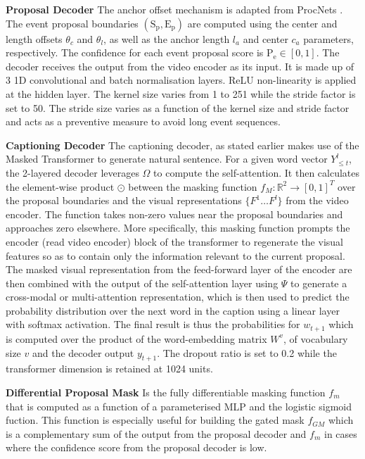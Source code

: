 \textbf{Proposal Decoder} The anchor offset mechanism is adapted from ProcNets \cite{Zhou2017TowardsAL}. The event proposal boundaries $(\mathrm{S_p}, \mathrm{E_p})$ are computed using the center and length offsets $\theta_c$ and $\theta_l$, as well as the anchor length $l_a$ and center $c_a$ parameters, respectively. The confidence for each event proposal score is $\mathrm{P_e} \in [0,1]$. The decoder receives the output from the video encoder as its input. It is made up of 3 1D convolutional and batch normalisation layers. ReLU non-linearity is applied at the hidden layer. The kernel size varies from 1 to 251 while the stride factor is set to 50. The stride size varies as a function of the kernel size and stride factor and acts as a preventive measure to avoid long event sequences. 

\textbf{Captioning Decoder} The captioning decoder, as stated earlier makes use of the Masked Transformer to generate natural sentence. For a given word vector $Y^l_{\leq t}$, the 2-layered decoder leverages $\Omega$ to compute the self-attention. It then calculates the element-wise product $\odot$ between the masking function $f_M: \mathbb{R}^{2} \rightarrow [0,1]^T$ over the proposal boundaries and the visual representations $\{F^1 \dots F^l\}$ from the video encoder. The function takes non-zero values near the proposal boundaries and approaches zero elsewhere. More specifically, this masking function prompts the encoder (read video encoder) block of the transformer to regenerate the visual features so as to contain only the information relevant to the current proposal. The masked visual representation from the feed-forward layer of the encoder are then combined with the output of the self-attention layer using $\Psi$ to generate a cross-modal or multi-attention representation, which is then used to predict the probability distribution over the next word in the caption using a linear layer with softmax activation. The final result is thus the probabilities for $w_{t+1}$ which is computed over the product of the word-embedding matrix $W^v$, of vocabulary size $v$ and the decoder output $y_{t+1}$. The dropout ratio is set to 0.2 while the transformer dimension is retained at 1024 units.

\textbf{Differential Proposal Mask} Is the fully differentiable masking function $f_m$ that is computed as a function of 
a parameterised MLP and the logistic sigmoid fuction. This function is especially useful for building the gated mask $f_{GM}$ which is a complementary sum of the output from the proposal decoder and $f_m$ in cases where the confidence score from the proposal decoder is low.

